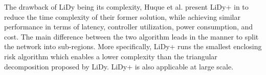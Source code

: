 \documentclass[a4paper,10pt]{article}
\begin{document}








The drawback of LiDy being its complexity, Huque et al. present LiDy+ in \cite{HuSi17} to reduce the time complexity of their former solution, while achieving similar performance in terms of latency, controller utilization, power consumption, and cost. The main difference between the two algorithm leads in the manner to split the network into sub-regions. More specifically, LiDy+ runs the smallest enclosing risk algorithm which enables a lower complexity than the triangular decomposition proposed by LiDy. LiDy+ is also applicable at large scale.
\end{document}

